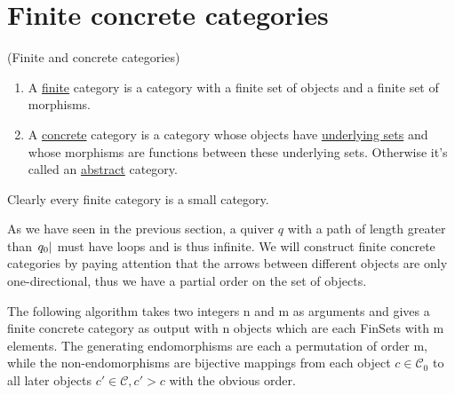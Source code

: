 
\section{Finite concrete categories}

\begin{definition}{(Finite and concrete categories)}
\renewcommand{\labelenumi}{(\theenumi)}
\begin{enumerate}
\item A \ul{finite} category is a category with a finite set of objects and a finite set of morphisms.
\item A \ul{concrete} category is a category whose objects have \ul{underlying sets} and whose morphisms are functions between these
underlying sets. Otherwise it's called an \ul{abstract} category.
\end{enumerate}
\end{definition}

Clearly every finite category is a small category.

As we have seen in the previous section, a quiver $q$ with a path of length greater than $\abs{q_{0}}$ must have loops and is thus infinite.
We will construct finite concrete categories by paying attention that the arrows between different objects are only one-directional, thus we
have a partial order on the set of objects.

The following algorithm takes two integers n and m as arguments and gives a finite concrete category as output with n objects which are each
FinSets with m elements. The generating endomorphisms are each a permutation of order m, while the non-endomorphisms are bijective
mappings from each object $c \in \mathcal{C}_{0}$ to all later objects $c' \in \mathcal{C}, c' > c$ with the obvious order.

